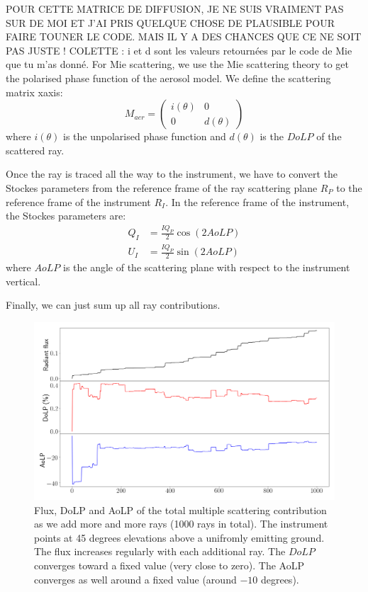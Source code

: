 \documentclass{article}
\begin{document}
POUR CETTE MATRICE DE DIFFUSION, JE NE SUIS VRAIMENT PAS SUR DE MOI ET J'AI PRIS QUELQUE CHOSE DE PLAUSIBLE POUR FAIRE TOUNER LE CODE. MAIS IL Y A DES CHANCES QUE CE NE SOIT PAS JUSTE !
COLETTE : i et d sont les valeurs retournées par le code de Mie que tu m'as donné.
For Mie scattering, we use the Mie scattering theory to get the polarised phase function of the aerosol model. We define the scattering matrix xaxis:
\begin{equation}
  M_{aer} = \begin{pmatrix}
  i(\theta) & 0\\
  0 & d(\theta)
  \end{pmatrix}
\end{equation}
where $i(\theta)$ is the unpolarised phase function and $d(\theta)$ is the $DoLP$ of the scattered ray.


Once the ray is traced all the way to the instrument, we have to convert the Stockes parameters from the reference frame of the ray scattering plane $R_P$ to the reference frame of the instrument $R_I$.
In the reference frame of the instrument, the Stockes parameters are:
\begin{align}
Q_I &= \frac{I  Q_P}{2} \cos(2  AoLP) \\
U_I &= \frac{I  Q_P}{2} \sin(2  AoLP)
\end{align}
where $AoLP$ is the angle of the scattering plane with respect to the instrument vertical.

Finally, we can just sum up all ray contributions.

\begin{figure}
  \includegraphics[width=\textwidth]{MS_cumulative_contribution.png}
  \caption{Flux, DoLP and AoLP of the total multiple scattering contribution as we add more and more rays (1000 rays in total). The instrument points at 45 degrees elevations above a unifromly emitting ground. The flux increases regularly with each additional ray. The $DoLP$ converges toward a fixed value (very close to zero). The AoLP converges as well around a fixed value (around $-10$ degrees). }
\end{figure}










\end{document}
